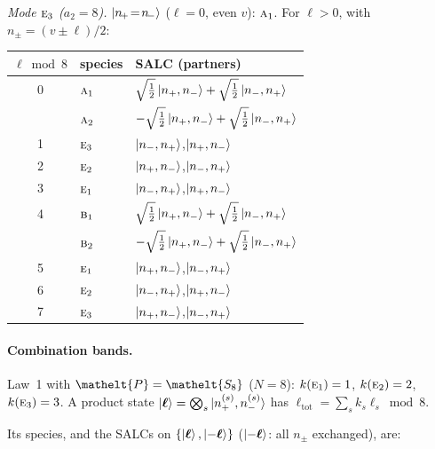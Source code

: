 \documentclass[11pt]{article}
\newcommand{\eltfont}[1]{{\let\sigma\eltsigma\mathelt{#1}}}
\newcommand{\irr}[1]{\text{\normalfont\scshape #1}}
\newcommand{\elt}[1]{\eltfont{#1}}
\newcommand{\pel}{\elt{P}}             %
\begin{document}
\emph{Mode $\irr{e}_{3}$ ($a_2=8$).} $\ket{n_{\!+}\!=\!n_{\!-}}$ ($\ell=0$, even $v$): $\irr{a}_{1}$. For $\ell>0$, with $n_\pm=(v\pm\ell)/2$:
\begin{longtable}{c l l}\hline $\ell\bmod 8$ & species & SALC (partners)\\ \hline\endhead
0 & $\irr{a}_{1}$ & $\sqrt{\tfrac{1}{2}}\ket{n_+,n_-}+\sqrt{\tfrac{1}{2}}\ket{n_-,n_+}$\\
 & $\irr{a}_{2}$ & $-\sqrt{\tfrac{1}{2}}\ket{n_+,n_-}+\sqrt{\tfrac{1}{2}}\ket{n_-,n_+}$\\
1 & $\irr{e}_{3}$ & $\ket{n_-,n_+}$,\quad $\ket{n_+,n_-}$\\
2 & $\irr{e}_{2}$ & $\ket{n_+,n_-}$,\quad $\ket{n_-,n_+}$\\
3 & $\irr{e}_{1}$ & $\ket{n_-,n_+}$,\quad $\ket{n_+,n_-}$\\
4 & $\irr{b}_{1}$ & $\sqrt{\tfrac{1}{2}}\ket{n_+,n_-}+\sqrt{\tfrac{1}{2}}\ket{n_-,n_+}$\\
 & $\irr{b}_{2}$ & $-\sqrt{\tfrac{1}{2}}\ket{n_+,n_-}+\sqrt{\tfrac{1}{2}}\ket{n_-,n_+}$\\
5 & $\irr{e}_{1}$ & $\ket{n_+,n_-}$,\quad $\ket{n_-,n_+}$\\
6 & $\irr{e}_{2}$ & $\ket{n_-,n_+}$,\quad $\ket{n_+,n_-}$\\
7 & $\irr{e}_{3}$ & $\ket{n_+,n_-}$,\quad $\ket{n_-,n_+}$\\
\hline\end{longtable}

\paragraph{Combination bands.}

Law~1 with $\pel=\elt{S_{8}}$ ($N=8$): $k(\irr{e}_{1})=1$, $k(\irr{e}_{2})=2$, $k(\irr{e}_{3})=3$. A product state $\ket{\boldsymbol\ell}=\bigotimes_s\ket{n_+^{(s)},n_-^{(s)}}$ has $\ell_{\mathrm{tot}}=\sum_sk_s\ell_s\bmod 8$.

Its species, and the SALCs on $\{\ket{\boldsymbol\ell},\ket{-\boldsymbol\ell}\}$ ($\ket{-\boldsymbol\ell}$: all $n_\pm$ exchanged), are:
\end{document}
